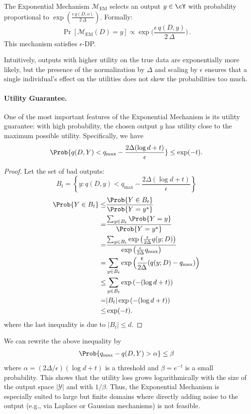 \documentclass[11pt, a4paper]{article}
\begin{document}
The Exponential Mechanism $\mathcal{M}_\text{EM}$ selects an output $y \in \cY$ with probability proportional to $\exp\!\left(\frac{\epsilon\, q(D,o)}{2\,\Delta}\right)$.
Formally:
\[ 
    \Pr[\mathcal{M}_\text{EM}(D) = y] \propto \exp\!\Big(\frac{\epsilon\, q(D,y)}{2\,\Delta}\Big)\,. 
\] 
This mechanism satisfies $\epsilon$-DP.

Intuitively, outputs with higher utility on the true data are exponentially more likely,
but the presence of the normalization by $\Delta$ and scaling by $\epsilon$ ensures that 
a single individual's effect on the utilities does not skew the probabilities too much.

\paragraph{Utility Guarantee.}
One of the most important features of the Exponential Mechanism is its utility guarantee:
with high probability, the chosen output $y$ has utility close to the maximum possible utility.
Specifically, we have
\[
    \Prob{q(D, Y) < q_{\max} - \frac{2 \Delta (\log d + t)}{\epsilon}} \leq \exp(-t).
\]
\begin{proof}
Let the set of bad outputs:
\[
    B_t = \left\{y: q(D, y) < q_{\max} - \frac{2 \Delta (\log d + t)}{\epsilon}\right\}
\]
\begin{align}
    \Prob{Y\in B_t} 
    \leq& \frac{\Prob{Y\in B_t}}{\Prob{Y=y^\star}}\\
    =& \frac{\sum_{y\in B_t} \Prob{Y=y}}{\Prob{Y=y^\star}}\\
    =& \frac{\sum_{y\in B_t}\exp\left(\frac{\epsilon}{2\Delta}q(y;D)\right)}
        {\exp\left(\frac{\epsilon}{2\Delta}q_{\max}\right)}\\
    =& \sum_{y\in B_t}\exp\left(\frac{\epsilon}{2\Delta}(q(y;D)-q_{\max})\right)\\
    \leq& \sum_{y\in B_t}\exp\left(-(\log d + t)\right)\\
    =& |B_t| \exp\left(-(\log d + t)\right)\\
    \leq& \exp(-t).
\end{align}
where the last inequality is due to $|B_t|\leq d$.
\end{proof}

We can rewrite the above inequality by
\begin{align}
    \Prob{q_{\max} - q(D, Y) > \alpha } \leq \beta
\end{align}
where $\alpha= (2\Delta/\epsilon)(\log d + t)$ is a threshold and $\beta = e^{-t}$ is a small probability.
This shows that the utility loss grows logarithmically with the size of the output space $|\mathcal{Y}|$ and with $1/\beta$.
Thus, the Exponential Mechanism is especially suited to large but finite domains where directly adding noise to the output (e.g., via Laplace or Gaussian mechanisms) is not feasible.
\end{document}
